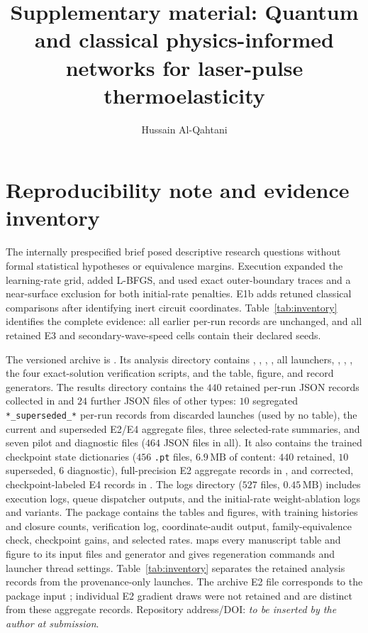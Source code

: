 \documentclass[11pt]{article}
\title{Supplementary material: Quantum and classical physics-informed
networks for laser-pulse thermoelasticity}
\author{Hussain Al-Qahtani}
\date{}
\begin{document}
\maketitle

\section{Reproducibility note and evidence inventory}

The internally prespecified brief posed descriptive research questions
without formal statistical hypotheses or equivalence margins. Execution
expanded the learning-rate grid, added L-BFGS, and used exact outer-boundary
traces and a near-surface exclusion for both initial-rate penalties. E1b
adds retuned classical comparisons after identifying inert circuit
coordinates. Table~\ref{tab:inventory} identifies the complete evidence:
all earlier per-run records are unchanged, and all retained E3 and
secondary-wave-speed cells contain their declared seeds.

The versioned archive is
. Its analysis directory contains
, , ,
, all launchers, ,
, , the four
exact-solution verification scripts, and the table, figure, and record
generators. The results directory contains the $440$ retained per-run
JSON records collected in  and $24$ further JSON files
of other types: $10$ segregated \texttt{*\_superseded\_*} per-run records
from discarded launches (used by no table), the current and superseded
E2/E4 aggregate files, three selected-rate summaries, and seven pilot and
diagnostic files ($464$ JSON files in all).
It also contains the trained checkpoint state dictionaries
($456$ \texttt{.pt} files, $6.9\,\mathrm{MB}$ of content: $440$ retained,
$10$ superseded, $6$ diagnostic), full-precision E2
aggregate records in , and corrected,
checkpoint-labeled E4 records in .
The logs directory ($527$ files, $0.45\,\mathrm{MB}$) includes execution logs, queue
dispatcher outputs, and the initial-rate weight-ablation logs and variants.
The package contains the tables and figures,  with
training histories and closure counts, verification log, coordinate-audit
output, family-equivalence check, checkpoint gains, and selected rates.
 maps every manuscript table and figure to its input
files and generator and gives regeneration commands and launcher thread
settings. Table~\ref{tab:inventory} separates the retained analysis records
from the provenance-only launches. The archive E2 file corresponds to the
package input ; individual E2 gradient draws were not
retained and are distinct from these aggregate records.
Repository address/DOI: \textit{to be inserted by the author at submission}.
\end{document}
